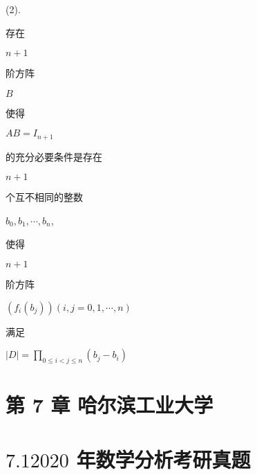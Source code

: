 \documentclass[10pt]{article}
\begin{document}
(2). \begin{CJK}{UTF8}{mj}存在\end{CJK} $n+1$ \begin{CJK}{UTF8}{mj}阶方阵\end{CJK} $B$ \begin{CJK}{UTF8}{mj}使得\end{CJK} $A B=I_{n+1}$ \begin{CJK}{UTF8}{mj}的充分必要条件是存在\end{CJK} $n+1$ \begin{CJK}{UTF8}{mj}个互不相同的整数\end{CJK} $b_{0}, b_{1}, \cdots, b_{n}$, \begin{CJK}{UTF8}{mj}使得\end{CJK} $n+1$ \begin{CJK}{UTF8}{mj}阶方阵\end{CJK} $\left(f_{i}\left(b_{j}\right)\right)(i, j=0,1, \cdots, n)$ \begin{CJK}{UTF8}{mj}满足\end{CJK} $|D|=\prod_{0 \leq i<j \leq n}\left(b_{j}-b_{i}\right)$

\section{第 7 章 哈尔滨工业大学}
\section{$7.12020$ 年数学分析考研真题}
\end{document}
